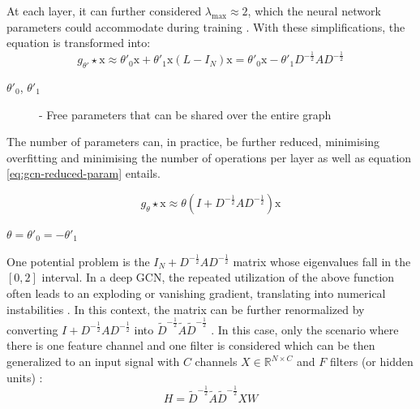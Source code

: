 At each layer, it can further considered $\lambda_\text{max} \approx 2$, which the neural network parameters could accommodate during training \cite{tangGraphNeuralNetworks2022}. With these simplifications, the equation is transformed into:
\begin{equation}
	g_{\theta'} \star \text{x} \approx \theta'_0 \text{x} + \theta'_1 \text{x} (L - I_N) \text{x} = \theta'_0 \text{x} - \theta'_1 D^{-\frac{1}{2}} AD^{-\frac{1}{2}}
\end{equation}

\begin{description}
	\item[$\theta'_0$, $\theta'_1$] - Free parameters that can be shared over the entire graph
\end{description}
	


The number of parameters can, in practice, be further reduced, minimising overfitting and minimising the number of operations per layer as well \cite{tangGraphNeuralNetworks2022} as equation \ref{eq:gcn-reduced-param} entails.

\begin{equation} \label{eq:gcn-reduced-param}
	g_\theta \star \text{x} \approx \theta (I + D^{-\frac{1}{2}} AD^{-\frac{1}{2}}) \text{x}
\end{equation}

\begin{description}
	\item[$\theta = \theta'_0 = - \theta'_1$]
\end{description}


One potential problem is the $I_N + D^{-\frac{1}{2}} AD^{-\frac{1}{2}}$ matrix whose eigenvalues fall in the $[0,2]$ interval. In a deep GCN, the repeated utilization of the above function often leads to an exploding or vanishing gradient, translating into numerical instabilities \cite{liuIntroductionGraphNeural2020, tangGraphNeuralNetworks2022}. In this context, the matrix can be further renormalized by converting $I + D^{-\frac{1}{2}} AD^{-\frac{1}{2}}$ into $\tilde{D}^{-\frac{1}{2}} \tilde{A}\tilde{D}^{-\frac{1}{2}}$ \cite{liuIntroductionGraphNeural2020, tangGraphNeuralNetworks2022}. 
In this case, only the scenario where there is one feature channel and one filter is considered which can be then generalized to an input signal with $C$ channels $X \in \mathbb{R}^{N \times C}$ and $F$ filters (or hidden units) \cite{liuIntroductionGraphNeural2020, tangGraphNeuralNetworks2022}:
\begin{equation}
	H = \tilde{D}^{-\frac{1}{2}} \tilde{A}\tilde{D}^{-\frac{1}{2}}XW    
\end{equation}

